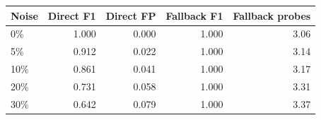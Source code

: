 \begin{tabular}{lrrrr}
\toprule
Noise & Direct F1 & Direct FP & Fallback F1 & Fallback probes \\
\midrule
0\% & 1.000 & 0.000 & 1.000 & 3.06 \\
5\% & 0.912 & 0.022 & 1.000 & 3.14 \\
10\% & 0.861 & 0.041 & 1.000 & 3.17 \\
20\% & 0.731 & 0.058 & 1.000 & 3.31 \\
30\% & 0.642 & 0.079 & 1.000 & 3.37 \\
\bottomrule
\end{tabular}
